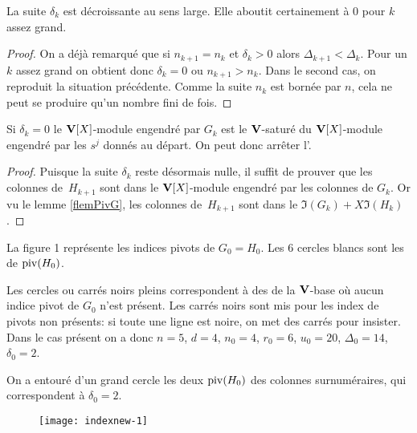 \begin{flemma} \label{flemFinDeLalgoCertaine}
La suite $\delta_k$ est décroissante au sens large. Elle aboutit certainement à $0$ pour $k$ assez grand. 
\end{flemma}
%
\begin{proof}{}
On a déjà remarqué que si $n_{k+1}=n_k$ et $\delta_k>0$ alors $\Delta_{k+1}<\Delta_k$. Pour un $k$ assez grand on obtient donc  $\delta_k=0$
ou $n_{k+1}>n_k$. Dans le second cas, on reproduit la situation précédente.
Comme la suite $n_k$ est bornée par $n$, cela ne peut se produire qu'un nombre fini de fois.
\end{proof}
%

\begin{flemma} \label{flemFinDeLalgoCorrect}
Si $\delta_k=0$ le $\mathbf{V}[X]$-module engendré par $G_k$ est le $\mathbf{V}$-saturé du
$\mathbf{V}[X]$-module engendré par les $s^j$ donnés au départ. On peut donc arr\^eter l'\algo. 
\end{flemma}
%
\begin{proof}{}
Puisque la suite $\delta_k$ reste désormais nulle, il suffit de prouver que
les colonnes de~$H_{k+1}$ sont dans le $\mathbf{V}[X]$-module engendré par les
colonnes de $G_k$. Or vu le lemme \ref{flemPivG}, les colonnes de~$H_{k+1}$
sont dans le \Vmo $\Im(G_k)+X\Im(H_k)$.
\end{proof}
%

\medskip {}

\smallskip 
La figure 1 représente les indices pivots de $G_0=H_0$. 
Les $6$ cercles blancs  sont les \elts de $\mathrm{piv}(H_0)$. 

Les cercles ou carrés noirs pleins correspondent
à des  \elts de la $\mathbf{V}$-base où aucun indice pivot de $G_0$ n'est présent.
Les carrés noirs sont mis pour les index de pivots non présents: si toute une ligne est noire, on met des carrés pour insister.
\\
Dans le cas présent on a donc $n=5$, $d=4$, $n_0=4$, $r_0=6$, $u_0=20$,
$\Delta_0=14$, $\delta_0=2$.

On a entouré d'un grand cercle les deux \elts $\mathrm{piv}(H_0)$ des colonnes surnuméraires, qui correspondent à $\delta_0=2$.

\begin{figure}[ht]   
%
\begin{center}
\texttt{[image: indexnew-1]}

\caption[figure 1]
{\label{ffig1} }

\end{center}
\end{figure}

